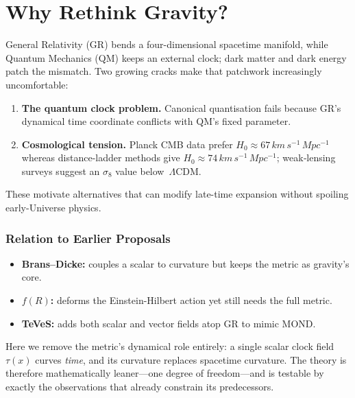\chapter{Why Rethink Gravity?}
General Relativity (GR) bends a four-dimensional spacetime manifold, while Quantum Mechanics 
(QM) keeps an external clock; dark matter and dark energy patch the mismatch. Two growing cracks make that patchwork increasingly uncomfortable:
\begin{enumerate}
  \item \textbf{The quantum clock problem.} Canonical quantisation fails because GR's dynamical time coordinate conflicts with QM's fixed parameter.
  \item \textbf{Cosmological tension.} Planck CMB data prefer $H_{0}\approx67\,\si{km\,s^{-1}\,Mpc^{-1}}$ whereas distance-ladder methods give $H_{0}\approx74\,\si{km\,s^{-1}\,Mpc^{-1}}$; weak‑lensing surveys suggest an $\sigma_{8}$ value below~$\Lambda$CDM.
\end{enumerate}
These motivate alternatives that can modify late-time expansion without spoiling early-Universe physics.

\subsection*{Relation to Earlier Proposals}

\begin{itemize}
  \item \textbf{Brans–Dicke:} couples a scalar to curvature but keeps the metric
        as gravity's core.
  \item \textbf{$f(R)$:} deforms the Einstein-Hilbert action yet still needs the
        full metric.
  \item \textbf{TeVeS:} adds both scalar and vector fields atop GR to mimic MOND.
\end{itemize} 

Here we remove the metric's dynamical role entirely: a single scalar clock
field $\tau(x)$ curves \emph{time}, and its curvature replaces spacetime
curvature.  The theory is therefore mathematically leaner—one degree of
freedom—and is testable by exactly the observations that already constrain its
predecessors.